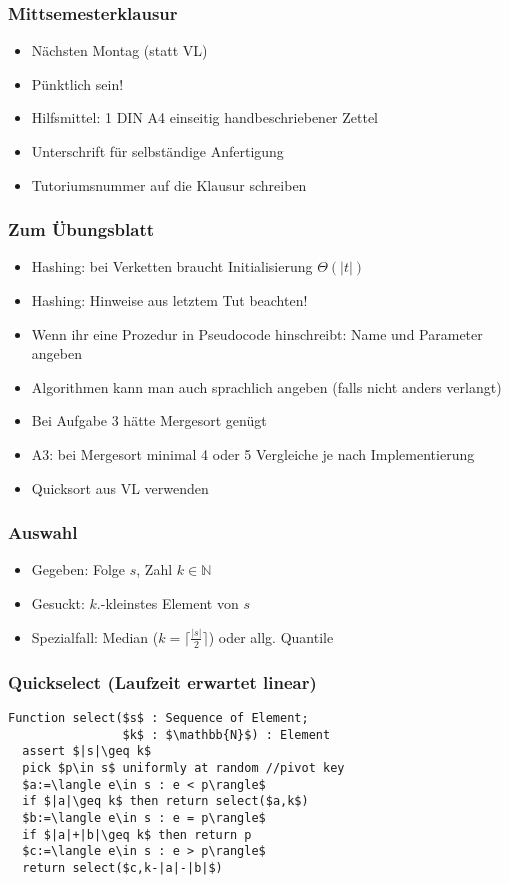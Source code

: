 

\begin{frame}
  \titlepage
\end{frame}

\begin{frame}
\frametitle{Mittsemesterklausur}
\begin{itemize}
\item Nächsten Montag (statt VL)
\item Pünktlich sein!
\item Hilfsmittel: 1 DIN A4 einseitig handbeschriebener Zettel
\item Unterschrift für selbständige Anfertigung
\item Tutoriumsnummer auf die Klausur schreiben
\end{itemize}
\end{frame}

\begin{frame}
\frametitle{Zum Übungsblatt}
\begin{itemize}
\item Hashing: bei Verketten braucht Initialisierung $\Theta(|t|)$
\item Hashing: Hinweise aus letztem Tut beachten!
\item Wenn ihr eine Prozedur in Pseudocode hinschreibt: Name und Parameter angeben
\item Algorithmen kann man auch sprachlich angeben (falls nicht anders verlangt)
\item Bei Aufgabe 3 hätte Mergesort genügt
\item A3: bei Mergesort minimal 4 oder 5 Vergleiche je nach Implementierung
\item Quicksort aus VL verwenden
\end{itemize}
\end{frame}

\begin{frame}
\frametitle{Auswahl}
\begin{itemize}
\item Gegeben: Folge $s$, Zahl $k\in\mathbb{N}$
\item Gesuckt: $k$.-kleinstes Element von $s$\pause
\item Spezialfall: Median ($k=\lceil \frac{|s|}{2}\rceil$) oder allg. Quantile
\end{itemize}
\end{frame}

\begin{frame}[fragile]
\frametitle{Quickselect (Laufzeit erwartet linear)}
\begin{lstlisting}
Function select($s$ : Sequence of Element;
                $k$ : $\mathbb{N}$) : Element
  assert $|s|\geq k$
  pick $p\in s$ uniformly at random //pivot key
  $a:=\langle e\in s : e < p\rangle$
  if $|a|\geq k$ then return select($a,k$)
  $b:=\langle e\in s : e = p\rangle$
  if $|a|+|b|\geq k$ then return p
  $c:=\langle e\in s : e > p\rangle$
  return select($c,k-|a|-|b|$)
\end{lstlisting}
\end{frame}

